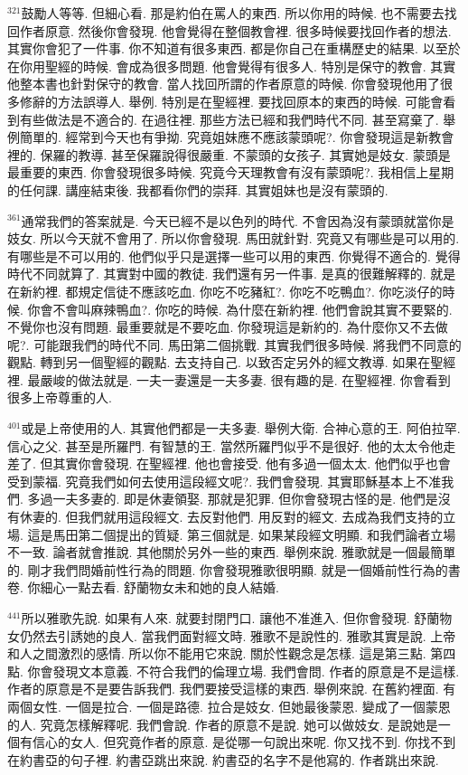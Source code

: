 \documentclass{book}
\begin{document}
$^{321}$鼓勵人等等.
但細心看.
那是約伯在罵人的東西.
所以你用的時候.
也不需要去找回作者原意.
然後你會發現.
他會覺得在整個教會裡.
很多時候要找回作者的想法.
其實你會犯了一件事.
你不知道有很多東西.
都是你自己在重構歷史的結果.
以至於在你用聖經的時候.
會成為很多問題.
他會覺得有很多人.
特別是保守的教會.
其實他整本書也針對保守的教會.
當人找回所謂的作者原意的時候.
你會發現他用了很多修辭的方法誤導人.
舉例.
特別是在聖經裡.
要找回原本的東西的時候.
可能會看到有些做法是不適合的.
在過往裡.
那些方法已經和我們時代不同.
甚至寫棄了.
舉例簡單的.
經常到今天也有爭拗.
究竟姐妹應不應該蒙頭呢?.
你會發現這是新教會裡的.
保羅的教導.
甚至保羅說得很嚴重.
不蒙頭的女孩子.
其實她是妓女.
蒙頭是最重要的東西.
你會發現很多時候.
究竟今天理教會有沒有蒙頭呢?.
我相信上星期的任何課.
講座結束後.
我都看你們的崇拜.
其實姐妹也是沒有蒙頭的.

$^{361}$通常我們的答案就是.
今天已經不是以色列的時代.
不會因為沒有蒙頭就當你是妓女.
所以今天就不會用了.
所以你會發現.
馬田就針對.
究竟又有哪些是可以用的.
有哪些是不可以用的.
他們似乎只是選擇一些可以用的東西.
你覺得不適合的.
覺得時代不同就算了.
其實對中國的教徒.
我們還有另一件事.
是真的很難解釋的.
就是在新約裡.
都規定信徒不應該吃血.
你吃不吃豬紅?.
你吃不吃鴨血?.
你吃淡仔的時候.
你會不會叫麻辣鴨血?.
你吃的時候.
為什麼在新約裡.
他們會說其實不要緊的.
不覺你也沒有問題.
最重要就是不要吃血.
你發現這是新約的.
為什麼你又不去做呢?.
可能跟我們的時代不同.
馬田第二個挑戰.
其實我們很多時候.
將我們不同意的觀點.
轉到另一個聖經的觀點.
去支持自己.
以致否定另外的經文教導.
如果在聖經裡.
最嚴峻的做法就是.
一夫一妻還是一夫多妻.
很有趣的是.
在聖經裡.
你會看到很多上帝尊重的人.

$^{401}$或是上帝使用的人.
其實他們都是一夫多妻.
舉例大衛.
合神心意的王.
阿伯拉罕.
信心之父.
甚至是所羅門.
有智慧的王.
當然所羅門似乎不是很好.
他的太太令他走差了.
但其實你會發現.
在聖經裡.
他也會接受.
他有多過一個太太.
他們似乎也會受到蒙福.
究竟我們如何去使用這段經文呢?.
我們會發現.
其實耶穌基本上不准我們.
多過一夫多妻的.
即是休妻領娶.
那就是犯罪.
但你會發現古怪的是.
他們是沒有休妻的.
但我們就用這段經文.
去反對他們.
用反對的經文.
去成為我們支持的立場.
這是馬田第二個提出的質疑.
第三個就是.
如果某段經文明顯.
和我們論者立場不一致.
論者就會推說.
其他關於另外一些的東西.
舉例來說.
雅歌就是一個最簡單的.
剛才我們問婚前性行為的問題.
你會發現雅歌很明顯.
就是一個婚前性行為的書卷.
你細心一點去看.
舒蘭物女未和她的良人結婚.

$^{441}$所以雅歌先說.
如果有人來.
就要封閉門口.
讓他不准進入.
但你會發現.
舒蘭物女仍然去引誘她的良人.
當我們面對經文時.
雅歌不是說性的.
雅歌其實是說.
上帝和人之間激烈的感情.
所以你不能用它來說.
關於性觀念是怎樣.
這是第三點.
第四點.
你會發現文本意義.
不符合我們的倫理立場.
我們會問.
作者的原意是不是這樣.
作者的原意是不是要告訴我們.
我們要接受這樣的東西.
舉例來說.
在舊約裡面.
有兩個女性.
一個是拉合.
一個是路德.
拉合是妓女.
但她最後蒙恩.
變成了一個蒙恩的人.
究竟怎樣解釋呢.
我們會說.
作者的原意不是說.
她可以做妓女.
是說她是一個有信心的女人.
但究竟作者的原意.
是從哪一句說出來呢.
你又找不到.
你找不到在約書亞的句子裡.
約書亞跳出來說.
約書亞的名字不是他寫的.
作者跳出來說.
\end{document}
